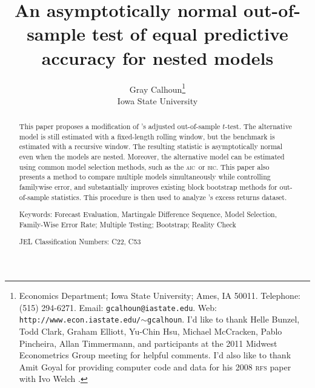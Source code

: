 \documentclass[10pt,fleqn,draft]{article}
\newcommand\citepos[2][]{\citeauthor{#2}'s \citeyearpar[#1]{#2}}
\theoremstyle{definition}
\newcommand{\aic}{\textsc{aic}}
\newcommand{\bic}{\textsc{bic}}
\begin{document}
\author{Gray Calhoun\thanks{ Economics Department; Iowa State
    University; Ames, IA 50011.  Telephone: (515) 294-6271.  Email:
    \texttt{gcalhoun@iastate.edu}.  Web:
    \texttt{http://www.econ.iastate.edu/$\sim$gcalhoun}.  I'd like to
    thank Helle Bunzel, Todd Clark, Graham Elliott, Yu-Chin Hsu,
    Michael McCracken, Pablo Pincheira, Allan Timmermann, and
    participants at the 2011 Midwest Econometrics Group meeting for
    helpful comments.  I'd also like to thank Amit Goyal for providing
    computer code and data for his 2008 \textsc{rfs} paper with Ivo
    Welch \citep{GoW:08}.} \\
  Iowa State University}

\title{An asymptotically normal out-of-sample
  test of equal predictive accuracy for nested models} 

\date{}
\maketitle

\begin{abstract} 
  \noindent This paper proposes a modification of \citepos[\textit{J.
    Econom.}]{ClW:07} adjusted out-of-sample $t$-test.  The
  alternative model is still estimated with a fixed-length rolling
  window, but the benchmark is estimated with a recursive window. The
  resulting statistic is asymptotically normal even when the models
  are nested.  Moreover, the alternative model can be estimated using
  common model selection methods, such as the \aic\ or \bic.  This
  paper also presents a method to compare multiple models
  simultaneously while controlling familywise error, and
  substantially improves existing block bootstrap methods for
  out-of-sample statistics.  This procedure is then used to analyze
  \citepos[\textit{Rev. Finan. Stud.}]{GoW:08} excess returns dataset.

\strut

\noindent Keywords: Forecast Evaluation, Martingale Difference
Sequence, Model Selection, Family-Wise Error Rate; Multiple Testing;
Bootstrap; Reality Check

\strut

\noindent JEL Classification Numbers: C22, C53

\end{abstract}
\end{document}
